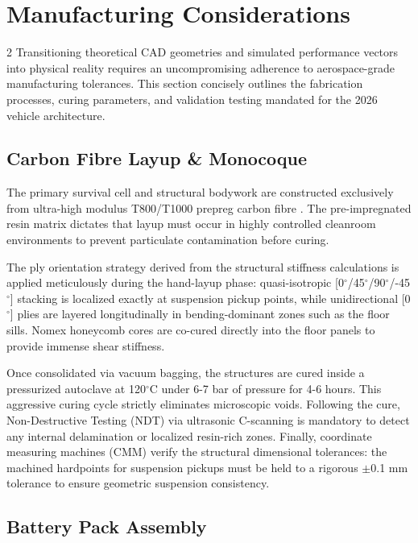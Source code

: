 \section{Manufacturing Considerations}

\begin{multicols}{2}
Transitioning theoretical CAD geometries and simulated performance vectors into physical reality requires an uncompromising adherence to aerospace-grade manufacturing tolerances. This section concisely outlines the fabrication processes, curing parameters, and validation testing mandated for the 2026 vehicle architecture.

\subsection{Carbon Fibre Layup \& Monocoque}

The primary survival cell and structural bodywork are constructed exclusively from ultra-high modulus T800/T1000 prepreg carbon fibre \cite{cfrp_manufacturing_lit}. The pre-impregnated resin matrix dictates that layup must occur in highly controlled cleanroom environments to prevent particulate contamination before curing. 

The ply orientation strategy derived from the structural stiffness calculations is applied meticulously during the hand-layup phase: quasi-isotropic [0$^\circ$/45$^\circ$/90$^\circ$/-45$^\circ$] stacking is localized exactly at suspension pickup points, while unidirectional [0$^\circ$] plies are layered longitudinally in bending-dominant zones such as the floor sills. Nomex honeycomb cores are co-cured directly into the floor panels to provide immense shear stiffness.

Once consolidated via vacuum bagging, the structures are cured inside a pressurized autoclave at 120$^\circ$C under 6-7 bar of pressure for 4-6 hours. This aggressive curing cycle strictly eliminates microscopic voids. Following the cure, Non-Destructive Testing (NDT) via ultrasonic C-scanning is mandatory to detect any internal delamination or localized resin-rich zones. Finally, coordinate measuring machines (CMM) verify the structural dimensional tolerances: the machined hardpoints for suspension pickups must be held to a rigorous $\pm$0.1 mm tolerance to ensure geometric suspension consistency.

\subsection{Battery Pack Assembly}


\end{multicols}
